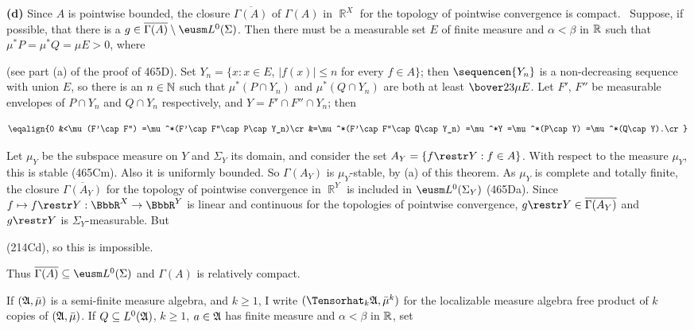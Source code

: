 {\medskip

{\bf (d)} Since $A$ is pointwise
bounded, the closure $\overline{\Gamma(A)}$ of $\Gamma(A)$ in $\BbbR^X$
for the topology
of pointwise convergence is compact.   \Quer\ Suppose, if possible, that
there is a $g\in\overline{\Gamma(A)}\setminus\eusm L^0(\Sigma)$.
Then there must
be a measurable set $E$ of finite measure and $\alpha<\beta$ in $\Bbb R$
such that $\mu^*P=\mu^*Q=\mu E>0$, where


\noindent (see part (a) of the proof of 465D).   Set
$Y_n=\{x:x\in E$, $|f(x)|\le n$ for every $f\in A\}$;  then
$\sequencen{Y_n}$ is a non-decreasing sequence with union $E$, so there is
an $n\in\Bbb N$ such that $\mu^*(P\cap Y_n)$ and $\mu^*(Q\cap Y_n)$ are
both at least $\bover23\mu E$.   Let $F'$, $F''$ be measurable envelopes of
$P\cap Y_n$ and $Q\cap Y_n$ respectively, and $Y=F'\cap F''\cap Y_n$;  then

$$\eqalign{0
&<\mu(F'\cap F'')
=\mu^*(F'\cap F''\cap P\cap Y_n)\cr
&=\mu^*(F'\cap F''\cap Q\cap Y_n)
=\mu^*Y
=\mu^*(P\cap Y)
=\mu^*(Q\cap Y).\cr}$$

Let $\mu_Y$ be the subspace measure on $Y$ and $\Sigma_Y$ its domain,
and consider the set
$A_Y=\{f\restr Y:f\in A\}$.   With respect to the measure $\mu_Y$,
this is stable (465Cm).   Also it is uniformly bounded.   So $\Gamma(A_Y)$
is $\mu_Y$-stable, by (a) of this theorem.
As $\mu_Y$ is complete and totally finite, the closure
$\overline{\Gamma(A_Y)}$ for the topology of pointwise convergence in
$\BbbR^Y$ is included in $\eusm L^0(\Sigma_Y)$ (465Da).   Since
$f\mapsto f\restr Y:\BbbR^X\to\BbbR^Y$ is linear and continuous for the
topologies of pointwise convergence, $g\restr Y\in\overline{\Gamma(A_Y)}$
and $g\restr Y$ is $\Sigma_Y$-measurable.   But


\noindent (214Cd), so this is impossible.\ \Bang

Thus $\overline{\Gamma(A)}\subseteq\eusm L^0(\Sigma)$ and $\Gamma(A)$ is
relatively compact.
}%

If $(\frak A,\bar\mu)$ is a semi-finite measure algebra, and $k\ge 1$, I
write $(\Tensorhat_k\frak A,\bar\mu^k)$ for the localizable measure
algebra free product of $k$ copies of $(\frak A,\bar\mu)$.   If $Q\subseteq L^0(\frak A)$, $k\ge 1$,
$a\in\frak A$ has finite measure and $\alpha<\beta$ in $\Bbb R$, set

